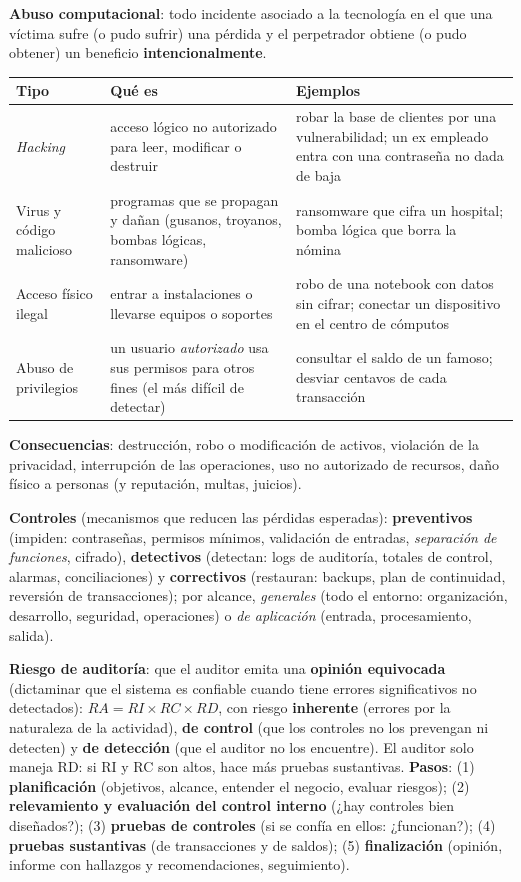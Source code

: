\documentclass[11pt,a4paper]{article}
\begin{document}
\textbf{Abuso computacional}: todo incidente asociado a la tecnología en el que una víctima sufre (o pudo sufrir)
una pérdida y el perpetrador obtiene (o pudo obtener) un beneficio \textbf{intencionalmente}.
\begin{center}\small
\begin{tabularx}{\textwidth}{@{}l X X@{}}
\toprule
\textbf{Tipo} & \textbf{Qué es} & \textbf{Ejemplos}\\
\midrule
\emph{Hacking} & acceso lógico no autorizado para leer, modificar o destruir & robar la base de clientes por una
vulnerabilidad; un ex empleado entra con una contraseña no dada de baja\\
Virus y código malicioso & programas que se propagan y dañan (gusanos, troyanos, bombas lógicas, ransomware) &
ransomware que cifra un hospital; bomba lógica que borra la nómina\\
Acceso físico ilegal & entrar a instalaciones o llevarse equipos o soportes & robo de una notebook con datos sin
cifrar; conectar un dispositivo en el centro de cómputos\\
Abuso de privilegios & un usuario \emph{autorizado} usa sus permisos para otros fines (el más difícil de
detectar) & consultar el saldo de un famoso; desviar centavos de cada transacción\\
\bottomrule
\end{tabularx}
\end{center}
\textbf{Consecuencias}: destrucción, robo o modificación de activos, violación de la privacidad, interrupción de
las operaciones, uso no autorizado de recursos, daño físico a personas (y reputación, multas, juicios).

\textbf{Controles} (mecanismos que reducen las pérdidas esperadas): \textbf{preventivos} (impiden: contraseñas,
permisos mínimos, validación de entradas, \emph{separación de funciones}, cifrado), \textbf{detectivos}
(detectan: logs de auditoría, totales de control, alarmas, conciliaciones) y \textbf{correctivos} (restauran:
backups, plan de continuidad, reversión de transacciones); por alcance, \emph{generales} (todo el entorno:
organización, desarrollo, seguridad, operaciones) o \emph{de aplicación} (entrada, procesamiento, salida).

\textbf{Riesgo de auditoría}: que el auditor emita una \textbf{opinión equivocada} (dictaminar que el sistema es
confiable cuando tiene errores significativos no detectados): $RA = RI \times RC \times RD$, con riesgo
\textbf{inherente} (errores por la naturaleza de la actividad), \textbf{de control} (que los controles no los
prevengan ni detecten) y \textbf{de detección} (que el auditor no los encuentre). El auditor solo maneja RD: si
RI y RC son altos, hace más pruebas sustantivas. \textbf{Pasos}: (1) \textbf{planificación} (objetivos, alcance,
entender el negocio, evaluar riesgos); (2) \textbf{relevamiento y evaluación del control interno} (¿hay
controles bien diseñados?); (3) \textbf{pruebas de controles} (si se confía en ellos: ¿funcionan?); (4)
\textbf{pruebas sustantivas} (de transacciones y de saldos); (5) \textbf{finalización} (opinión, informe con
hallazgos y recomendaciones, seguimiento).
\end{document}
